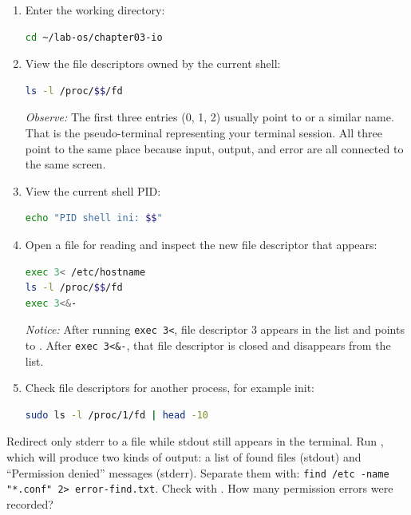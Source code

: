 \begin{enumerate}
    \item Enter the working directory:
\begin{lstlisting}[language=bash, caption={Entering the working directory}]
cd ~/lab-os/chapter03-io
\end{lstlisting}

    \item View the file descriptors owned by the current shell:
\begin{lstlisting}[language=bash, caption={File descriptors of the active shell process}]
ls -l /proc/$$/fd
\end{lstlisting}
    \textit{Observe:} The first three entries (0, 1, 2) usually point to  or a similar name. That is the pseudo-terminal representing your terminal session. All three point to the same place because input, output, and error are all connected to the same screen.

    \item View the current shell PID:
\begin{lstlisting}[language=bash, caption={Current shell PID}]
echo "PID shell ini: $$"
\end{lstlisting}

    \item Open a file for reading and inspect the new file descriptor that appears:
\begin{lstlisting}[language=bash, caption={Observing a new file descriptor}]
exec 3< /etc/hostname
ls -l /proc/$$/fd
exec 3<&-
\end{lstlisting}
    \textit{Notice:} After running \texttt{exec 3<}, file descriptor 3 appears in the list and points to . After \texttt{exec 3<\&-}, that file descriptor is closed and disappears from the list.

    \item Check file descriptors for another process, for example init:
\begin{lstlisting}[language=bash, caption={File descriptors of process PID 1}]
sudo ls -l /proc/1/fd | head -10
\end{lstlisting}
\end{enumerate}

\begin{challengebox}
Redirect only stderr to a file while stdout still appears in the terminal. Run , which will produce two kinds of output: a list of found files (stdout) and ``Permission denied'' messages (stderr). Separate them with: \texttt{find /etc -name "*.conf" 2> error-find.txt}. Check  with . How many permission errors were recorded?
\end{challengebox}

